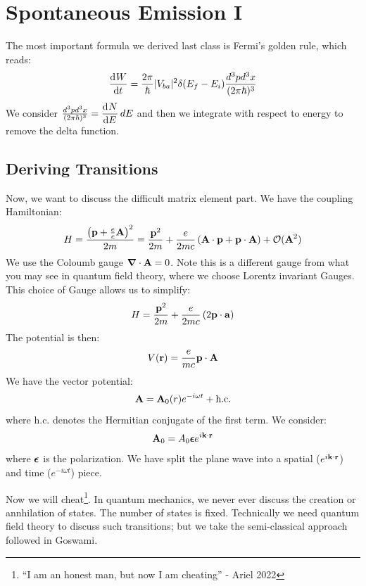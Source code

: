 \section{Spontaneous Emission I}
The most important formula we derived last class is Fermi's golden rule, which reads:
\begin{equation}
    \dod{W}{t} = \frac{2\pi}{\hbar}\abs{V_{ba}}^2\delta(E_f - E_i)\frac{d^3pd^3x}{(2\pi\hbar)^3}
\end{equation}
We consider $\frac{d^3pd^3x}{(2\pi\hbar)^3} = \dod{N}{E}dE$ and then we integrate with respect to energy to remove the delta function.

\subsection{Deriving Transitions}
Now, we want to discuss the difficult matrix element part. We have the coupling Hamiltonian:
\begin{equation}
    H = \frac{\left(\mathbf{p} + \frac{e}{c}\mathbf{A}\right)^2}{2m} = \frac{\mathbf{p}^2}{2m} + \frac{e}{2mc}\left(\mathbf{A}\cdot \mathbf{p} + \mathbf{p} \cdot \mathbf{A}\right) + \mathcal{O}(\mathbf{A}^2)
\end{equation}
We use the Coloumb gauge $\nabla \cdot \v{A} = 0$. Note this is a different gauge from what you may see in quantum field theory, where we choose Lorentz invariant Gauges. This choice of Gauge allows us to simplify:
\begin{equation}
    H = \frac{\mathbf{p}^2}{2m} + \frac{e}{2mc}\left(2\mathbf{p}\cdot\mathbf{a}\right)
\end{equation}
The potential is then:
\begin{equation}
    V(\mathbf{r}) = \frac{e}{mc}\mathbf{p} \cdot \mathbf{A}
\end{equation}
We have the vector potential:
\begin{equation}
    \mathbf{A} = \mathbf{A}_0(r)e^{-i\omega t} + \text{h.c.}
\end{equation}
where h.c. denotes the Hermitian conjugate of the first term. We consider:
\begin{equation}
    \mathbf{A}_0 = A_0\mbox{\boldmath$ \epsilon $}e^{i\mathbf{k} \cdot \mathbf{r}}
\end{equation}
where $\mbox{\boldmath$ \epsilon $}$ is the polarization. We have split the plane wave into a spatial ($e^{i\mathbf{k} \cdot \mathbf{r}}$) and time ($e^{-i\omega t}$) piece. 

Now we will cheat\footnote{``I am an honest man, but now I am cheating'' - Ariel 2022}. In quantum mechanics, we never ever discuss the creation or annhilation of states. The number of states is fixed. Technically we need quantum field theory to discuss such transitions; but we take the semi-classical approach followed in Goswami.


